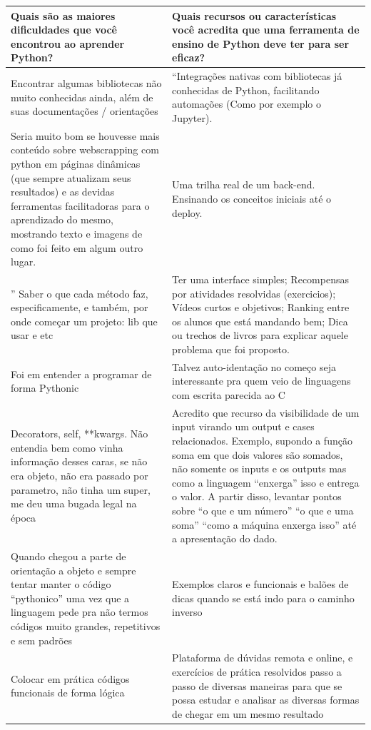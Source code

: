\begin{longtable}{| p{} | p{} |}
    \hline
    \textbf{Quais são as maiores dificuldades que você encontrou ao aprender Python?} & \textbf{Quais recursos ou características você acredita que uma ferramenta de ensino de Python deve ter para ser eficaz?} \\ \hline
    Encontrar algumas bibliotecas não muito conhecidas ainda, além de suas documentações / orientações & ``Integrações nativas com bibliotecas já conhecidas de Python, facilitando automações (Como por exemplo o Jupyter). \\ \hline
    Seria muito bom se houvesse mais conteúdo sobre webscrapping com python em páginas dinâmicas (que sempre atualizam seus resultados) e as devidas ferramentas facilitadoras para o aprendizado do mesmo, mostrando texto e imagens de como foi feito em algum outro lugar. & Uma trilha real de um back-end. Ensinando os conceitos iniciais até o deploy. \\ \hline''
    Saber o que cada método faz, especificamente, e também, por onde começar um projeto: lib que usar e etc & Ter uma interface simples;  Recompensas por atividades resolvidas (exercicios); Vídeos curtos e objetivos; Ranking entre os alunos que está mandando bem; Dica ou trechos de livros para explicar aquele problema que foi proposto. \\ \hline
    Foi em entender a programar de forma Pythonic & Talvez auto-identação no começo seja interessante pra quem veio de linguagens com escrita parecida ao C \\ \hline
    Decorators, self, **kwargs. Não entendia bem como vinha informação desses caras, se não era objeto, não era passado por parametro, não tinha um super, me deu uma bugada legal na época & Acredito que recurso da visibilidade de um input virando um output e cases relacionados. Exemplo, supondo a função soma em que dois valores são somados, não somente os inputs e os outputs mas como a linguagem “enxerga” isso e entrega o valor. A partir disso, levantar pontos sobre “o que e um número” “o que e uma soma” “como a máquina enxerga isso” até a apresentação do dado. \\ \hline
    Quando chegou a parte de orientação a objeto e sempre tentar manter o código “pythonico” uma vez que a linguagem pede pra não termos códigos muito grandes, repetitivos e sem padrões & Exemplos claros e funcionais e balões de dicas quando se está indo para o caminho inverso \\ \hline
    Colocar em prática códigos funcionais de forma lógica & Plataforma de dúvidas remota e online, e exercícios de prática resolvidos passo a passo de diversas maneiras para que se possa estudar e analisar as diversas formas de chegar em um mesmo resultado \\ \hline

\end{longtable}
